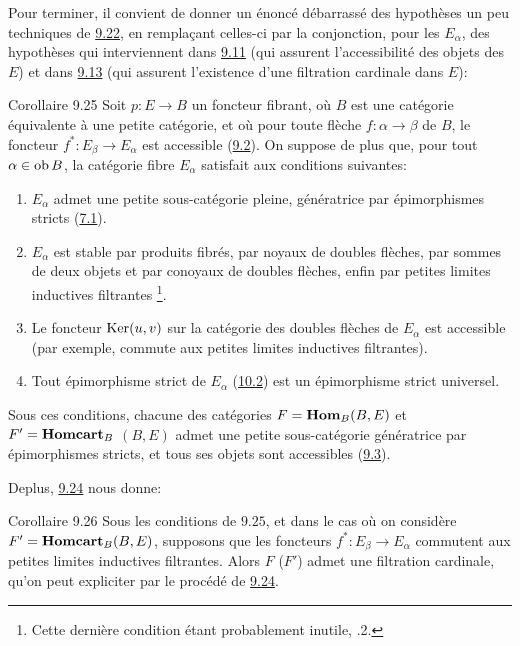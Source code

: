 \documentclass[10pt]{../fichiers-configuration-latex/smfart}
\def\labelenumi{(\theenumi)}
\begin{document}
Pour terminer, il convient de donner un énoncé débarrassé des
hypothèses un peu techniques de \hyperref[I.them9.22]{9.22}, en remplaçant
celles-ci par la conjonction, pour les $E_{\alpha}$, des hypothèses
qui interviennent dans \hyperref[I.prop9.11]{9.11} (qui assurent
l'accessibilité des objets des $E$) et dans \hyperref[I.prop9.13]{9.13} (qui
assurent l'existence d'une filtration cardinale dans $E$):

\begin{enonce*}{Corollaire 9.25}
Soit $p:E\rightarrow B$ un foncteur fibrant, où $B$ est une
catégorie équivalente à une petite catégorie, et
où pour toute
flèche $f:\alpha\rightarrow \beta$ de $B$, le foncteur
$f^\ast:E_{\beta}\rightarrow E_{\alpha}$ est accessible (\hyperref[I.def9.2]{9.2}). On
suppose de plus que, pour tout $\alpha\in \operatorname{ob} B$, la catégorie fibre
$E_{\alpha}$ satisfait aux conditions suivantes:
\begin{enumerate}
\renewcommand{\theenumi}{\alph{enumi}}
\renewcommand{\labelenumi}{\theenumi)}
\item $E_{\alpha}$ admet une petite sous-catégorie pleine,
génératrice par épimorphismes stricts (\hyperref[I.def7.1]{7.1}).

\item $E_{\alpha}$ est stable par produits fibrés, par noyaux de
doubles flèches, par sommes de deux objets et par conoyaux de
doubles flèches, enfin par petites limites inductives filtrantes
\footnote[1]{Cette dernière condition étant probablement inutile,
.2.}.

\item Le foncteur $\operatorname{Ker}(u,v)$ sur la catégorie des doubles flèches
de $E_{\alpha}$ est accessible (par exemple, commute aux petites
limites inductives filtrantes).

\item Tout épimorphisme strict de $E_{\alpha}$ (\hyperref[I.sec10.2]{10.2}) est un
épimorphisme strict universel.
\end{enumerate}

Sous ces conditions, chacune des catégories $F=\operatorname{\mathbf{Hom}}_B(B,E)$ et
$F'=\operatorname{\mathbf{Homcart}}_B$ $(B,E)$ admet une petite sous-catégorie génératrice
par épimorphismes stricts, et tous ses objets sont accessibles
(\hyperref[I.def9.3]{9.3}).
\end{enonce*}
De\pageoriginale plus, \hyperref[I.cor9.24]{9.24} nous donne:

\begin{enonce*}{Corollaire 9.26}
Sous les conditions de $9.25$, et dans le cas où on considère
$F'=\operatorname{\mathbf{Homcart}}_B(B,E)$, supposons que les foncteurs
$f^\ast:E_{\beta}\rightarrow E_{\alpha}$ commutent aux petites
limites inductives filtrantes. Alors $F$ (\resp $F'$) admet une
filtration cardinale, qu'on peut expliciter par le procédé de
\hyperref[I.cor9.24]{9.24}.
\end{enonce*}
\end{document}

